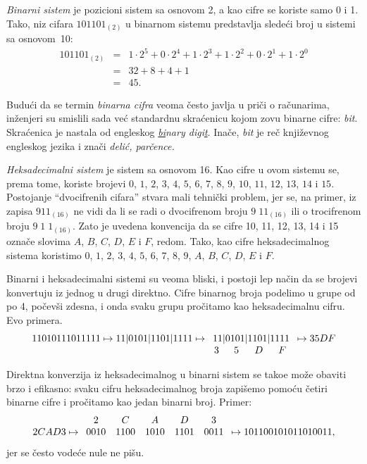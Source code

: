 \medskip

\emph{Binarni sistem} je pozicioni sistem sa osnovom 2, a kao cifre se
koriste samo 0 i 1. Tako, niz cifara $101101_{(2)}$ u binarnom sistemu
predstavlja slede\'ci broj u sistemi sa osnovom~10:
$$
    \begin{array}{lcl}
        101101_{(2)}
            &=& 1 \cdot 2^5 + 0 \cdot 2^4 + 1 \cdot 2^3 +
                1 \cdot 2^2 + 0 \cdot 2^1 + 1 \cdot 2^0\\
            &=& 32 + 8 + 4 + 1\\
            &=& 45.
    \end{array}
$$

Budu\'ci da se termin \emph{binarna cifra} veoma \v cesto javlja u pri\v ci
o ra\v cunarima, in\v zenjeri su smislili sada ve\'c standardnu skra\'cenicu kojom
zovu binarne cifre: \emph{bit}. Skra\'cenica je nastala od engleskog
\emph{\underline{bi}nary digi\underline{t}}. Ina\v ce, \emph{bit}
je re\v c knji\v zevnog engleskog jezika i zna\v ci \emph{deli\'c,
par\v cence.}

\emph{Heksadecimalni sistem} je sistem sa osnovom 16. Kao cifre
u ovom sistemu se, prema tome, koriste brojevi
$0$, $1$, $2$, $3$, $4$, $5$, $6$, $7$, $8$, $9$, $10$, $11$,
$12$, $13$, $14$ i $15$.
Postojanje \enquote{dvocifrenih cifara} stvara mali tehni\v cki problem, jer se,
na primer, iz zapisa $911_{(16)}$ ne vidi da li se radi o dvocifrenom
broju $9\;11_{(16)}$ ili o trocifrenom broju $9\;1\;1_{(16)}$.
Zato je uvedena konvencija da se cifre 10, 11, 12, 13, 14 i 15 ozna\v ce
slovima $A$, $B$, $C$, $D$, $E$ i $F$, redom. Tako, kao cifre
heksadecimalnog sistema koristimo
$0$, $1$, $2$, $3$, $4$, $5$, $6$, $7$, $8$, $9$, $A$,
$B$, $C$, $D$, $E$ i $F$.

Binarni i heksadecimalni sistemi su veoma bliski, i postoji
lep na\v cin da se brojevi konvertuju iz jednog u drugi direktno.
Cifre binarnog broja podelimo u grupe od po 4, po\v cev\v si zdesna,
i onda svaku grupu pro\v citamo kao heksadecimalnu cifru. Evo
primera.
{\def\x#1{\multicolumn{1}{c}{#1}}%
$$
    11010111011111 \mapsto
    11|0101|1101|1111 \mapsto
    \begin{array}[t]{c@{|}c@{|}c@{|}c}
        11&0101&1101&1111\\
         \x 3&   \x 5&   \x D&   \x F
    \end{array} \mapsto
    35DF
$$
}%

Direktna konverzija iz heksadecimalnog u binarni sistem se tako\dj e mo\v ze
oba\-vi\-ti brzo i efikasno: svaku cifru heksadecimalnog broja zapi\v semo
pomo\'cu \v cetiri binarne cifre i pro\v citamo kao jedan binarni broj.
Primer:
$$
    2CAD3 \mapsto
    \begin{array}[b]{ccccc}
        2 &    C &    A &    D &    3\\
     0010 & 1100 & 1010 & 1101 & 0011
    \end{array} \mapsto
     10 1100 1010 1101 0011,
$$
jer se \v cesto vode\'ce nule ne pi\v su.


